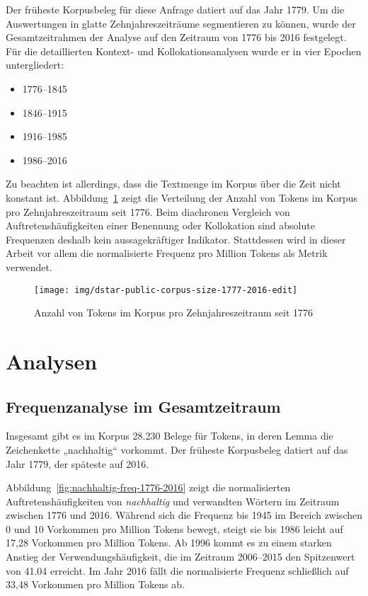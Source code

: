 \documentclass[
    german,
    a4paper,%
    12pt,%
    oneside,%
    toc=bibliography,
    final,
]{scrartcl}
\begin{document}
Der früheste Korpusbeleg für diese Anfrage datiert auf das Jahr 1779. Um die Auswertungen in glatte Zehnjahreszeiträume segmentieren zu können, wurde der Gesamtzeitrahmen der Analyse auf den Zeitraum von 1776 bis 2016 festgelegt. Für die detaillierten Kontext- und Kollokationsanalysen wurde er in vier Epochen untergliedert:

\begin{itemize}
\item 1776–1845
\item 1846–1915
\item 1916–1985
\item 1986–2016
\end{itemize}

Zu beachten ist allerdings, dass die Textmenge im Korpus über die Zeit nicht konstant ist. Abbildung~\ref{fig:corpus-size} zeigt die Verteilung der Anzahl von Tokens im Korpus pro Zehnjahreszeitraum seit 1776. Beim diachronen Vergleich von Auftretenshäufigkeiten einer Benennung oder Kollokation sind absolute Frequenzen deshalb kein aussagekräftiger Indikator. Stattdessen wird in dieser Arbeit vor allem die normalisierte Frequenz pro Million Tokens als Metrik verwendet.

\begin{figure}[h!]
\centering
\texttt{[image: img/dstar-public-corpus-size-1777-2016-edit]}
\caption[corpus-size]{Anzahl von Tokens im Korpus pro Zehnjahreszeitraum seit 1776\footnotemark}
\label{fig:corpus-size}
\end{figure}

\section{Analysen}
\label{sec:analysen}

\subsection{Frequenzanalyse im Gesamtzeitraum}
\label{subsec:freq-gesamt}

Insgesamt gibt es im Korpus 28.230 Belege für Tokens, in deren Lemma die Zeichenkette „nachhaltig“ vorkommt. Der früheste Korpusbeleg datiert auf das Jahr 1779, der späteste auf 2016.

Abbildung~\ref{fig:nachhaltig-freq-1776-2016} zeigt die normalisierten Auftretenshäufigkeiten von \textit{nachhaltig} und verwandten Wörtern im Zeitraum zwischen 1776 und 2016. Während sich die Frequenz bis 1945 im Bereich zwischen 0 und 10 Vorkommen pro Million Tokens bewegt, steigt sie bis 1986 leicht auf 17,28 Vorkommen pro Million Tokens. Ab 1996 kommt es zu einem starken Anstieg der Verwendungshäufigkeit, die im Zeitraum 2006–2015 den Spitzenwert von 41.04 erreicht. Im Jahr 2016 fällt die normalisierte Frequenz schließlich auf 33,48 Vorkommen pro Million Tokens ab.
\end{document}
